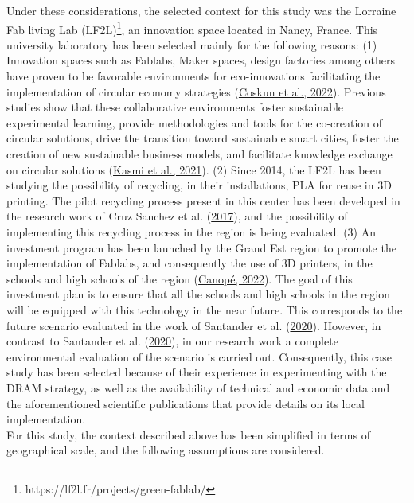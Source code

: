 \documentclass[12pt]{elsarticle} %
\begin{document}
Under these considerations, the selected context for this study was the Lorraine Fab living Lab (LF2L)\footnote{https://lf2l.fr/projects/green-fablab/}, an innovation space located in Nancy, France. This university laboratory has been selected mainly for the following reasons:
(1) Innovation spaces such as Fablabs, Maker spaces, design factories among others have proven to be favorable environments for eco-innovations facilitating the implementation of circular economy strategies (\protect\hyperlink{ref-coskun2022}{Coskun et al., 2022}).
Previous studies show that these collaborative environments foster sustainable experimental learning, provide methodologies and tools for the co-creation of circular solutions, drive the transition toward sustainable smart cities, foster the creation of new sustainable business models, and facilitate knowledge exchange on circular solutions (\protect\hyperlink{ref-Kasmi2021}{Kasmi et al., 2021}).
(2) Since 2014, the LF2L has been studying the possibility of recycling, in their installations, PLA for reuse in 3D printing.
The pilot recycling process present in this center has been developed in the research work of Cruz Sanchez et al. (\protect\hyperlink{ref-CruzSanchez2017}{2017}), and the possibility of implementing this recycling process in the region is being evaluated.
(3) An investment program has been launched by the Grand Est region to promote the implementation of Fablabs, and consequently the use of 3D printers, in the schools and high schools of the region (\protect\hyperlink{ref-canope2022}{Canopé, 2022}).
The goal of this investment plan is to ensure that all the schools and high schools in the region will be equipped with this technology in the near future.
This corresponds to the future scenario evaluated in the work of Santander et al. (\protect\hyperlink{ref-Santander2020}{2020}).
However, in contrast to Santander et al. (\protect\hyperlink{ref-Santander2020}{2020}), in our research work a complete environmental evaluation of the scenario is carried out.
Consequently, this case study has been selected because of their experience in experimenting with the DRAM strategy, as well as the availability of technical and economic data and the aforementioned scientific publications that provide details on its local implementation.\\
For this study, the context described above has been simplified in terms of geographical scale, and the following assumptions are considered.
\end{document}
